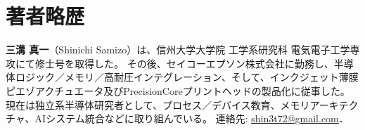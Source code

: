 \documentclass[conference]{IEEEtran}
\begin{document}
\section*{著者略歴}
\textbf{三溝 真一}（Shinichi Samizo）は、信州大学大学院 工学系研究科 電気電子工学専攻にて修士号を取得した。  
その後、セイコーエプソン株式会社に勤務し、半導体ロジック／メモリ／高耐圧インテグレーション、そして、インクジェット薄膜ピエゾアクチュエータ及びPrecisionCoreプリントヘッドの製品化に従事した。  
現在は独立系半導体研究者として、プロセス／デバイス教育、メモリアーキテクチャ、AIシステム統合などに取り組んでいる。  
連絡先: \href{mailto:shin3t72@gmail.com}{shin3t72@gmail.com}．
\end{document}
